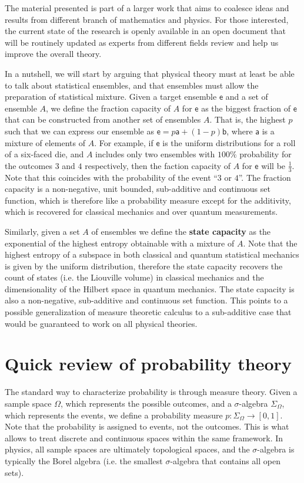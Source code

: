 \documentclass[10pt,twocolumn, nofootinbib]{revtex4-2}
\newcommand{\ens}[1][e] {\mathsf{#1}} %
\begin{document}
The material presented is part of a larger work that aims to coalesce ideas and results from different branch of mathematics and physics. For those interested, the current state of the research is openly available in an open document that will be routinely updated as experts from different fields review and help us improve the overall theory.

In a nutshell, we will start by arguing that physical theory must at least be able to talk about statistical ensembles, and that ensembles must allow the preparation of statistical mixture. Given a target ensemble $\ens$ and a set of ensemble $A$, we define the fraction capacity of $A$ for $\ens$ as the biggest fraction of $\ens$ that can be constructed from another set of ensembles $A$. That is, the highest $p$ such that we can express our ensemble as $\ens = p \ens[a] + (1-p) \ens[b]$, where $\ens[a]$ is a mixture of elements of $A$. For example, if $\ens$ is the uniform distributions for a roll of a six-faced die, and $A$ includes only two ensembles with $100\%$ probability for the outcomes $3$ and $4$ respectively, then the faction capacity of $A$ for $\ens$ will be $\frac{1}{3}$. Note that this coincides with the probability of the event ``$3$ or $4$''. The fraction capacity is a non-negative, unit bounded, sub-additive and continuous set function, which is therefore like a probability measure except for the additivity, which is recovered for classical mechanics and over quantum measurements.

Similarly, given a set $A$ of ensembles we define the \textbf{state capacity} as the exponential of the highest entropy obtainable with a mixture of $A$. Note that the highest entropy of a subspace in both classical and quantum statistical mechanics is given by the uniform distribution, therefore the state capacity recovers the count of states (i.e. the Liouville volume) in classical mechanics and the dimensionality of the Hilbert space in quantum mechanics. The state capacity is also a non-negative, sub-additive and continuous set function. This points to a possible generalization of measure theoretic calculus to a sub-additive case that would be guaranteed to work on all physical theories.

\section{Quick review of probability theory}

The standard way to characterize probability is through measure theory. Given a sample space $\Omega$, which represents the possible outcomes, and a $\sigma$-algebra $\Sigma_{\Omega}$, which represents the events, we define a probability measure $p : \Sigma_{\Omega} \to [0,1]$. Note that the probability is assigned to events, not the outcomes. This is what allows to treat discrete and continuous spaces within the same framework. In physics, all sample spaces are ultimately topological spaces, and the $\sigma$-algebra is typically the Borel algebra (i.e. the smallest $\sigma$-algebra that contains all open sets).
\end{document}
